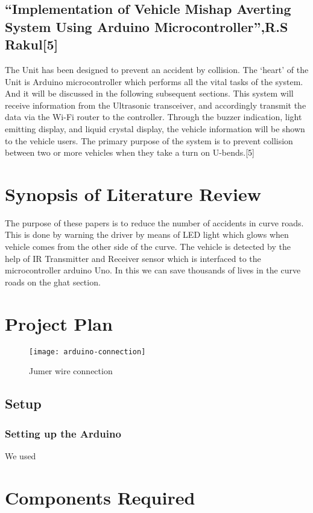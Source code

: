 \documentclass[conference]{IEEEtran}
\begin{document}
    \subsection{“Implementation of Vehicle Mishap Averting System Using Arduino Microcontroller”,R.S Rakul[5]}
    The Unit has been designed to prevent an accident by collision. The ‘heart' of the Unit is
    Arduino microcontroller which performs all the vital tasks of the system. And it will be discussed in the
    following subsequent sections. This system will receive information from the Ultrasonic transceiver, and
    accordingly transmit the data via the Wi-Fi router to the controller. Through the buzzer indication, light
    emitting display, and liquid crystal display, the vehicle information will be shown to the vehicle users. The
    primary purpose of the system is to prevent collision between two or more vehicles when they take a turn on
    U-bends.[5]

    \section{Synopsis of Literature Review}
    The purpose of these papers is to reduce the number of
    accidents in curve roads. This is done by warning the driver
    by means of LED light which glows when vehicle comes from
    the other side of the curve. The vehicle is detected by the
    help of IR Transmitter and Receiver sensor which is
    interfaced to the microcontroller arduino Uno. In this we can
    save thousands of lives in the curve roads on the ghat
    section.

    \section{Project Plan}
    \begin{figure}[htbp]
        \centerline{\texttt{[image: arduino-connection]}}
        \caption{Jumer wire connection}
        \label{fig}
    \end{figure}
    \subsection{Setup}
    \subsubsection{Setting up the Arduino}
    We used



    \section{Components Required}
\end{document}
